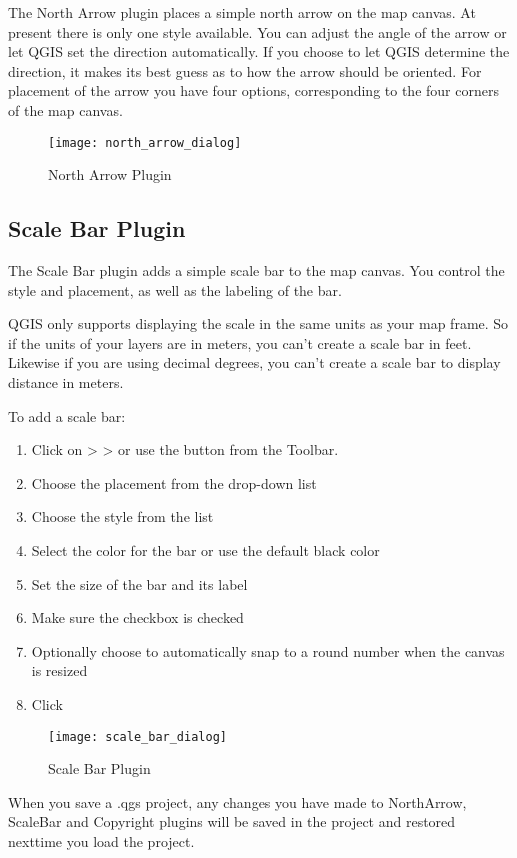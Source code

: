 The North Arrow plugin places a simple north arrow on the map canvas. At
present there is only one style available. You can adjust the angle of the
arrow or let QGIS set the direction automatically. If you choose to let
QGIS determine the direction, it makes its best guess as to how the arrow
should be oriented. For placement of the arrow you have four options, 
corresponding to the four corners of the map canvas.

\begin{figure}[ht]
   \centering
   \caption{North Arrow Plugin \nixcaption}\label{fig:north_arrow}\smallskip
   \texttt{[image: north\_arrow\_dialog]}
\end{figure}

\subsection{Scale Bar Plugin}
The Scale Bar plugin adds a simple scale bar to the map canvas. You
control the style and placement, as well as the labeling of the bar. 

QGIS only supports displaying the scale in the same units as your map frame. So
if the units of your layers are in meters, you can't create a scale bar in
feet. Likewise if you are using decimal degrees, you can't create a scale
bar to display distance in meters.

To add a scale bar:

\begin{enumerate}
\item Click on  >  >  or use the  button from the Toolbar.
\item Choose the placement from the  drop-down list
\item Choose the style from the  list
\item Select the color for the bar  or use the default black color
\item Set the size of the bar and its label 
\item Make sure the  checkbox is checked
\item Optionally choose to automatically snap to a round number when the
  canvas is resized 
\item Click  
\end{enumerate} 

\begin{figure}[ht]
   \centering
   \caption{Scale Bar Plugin \nixcaption}\label{fig:scale_bar}\smallskip
   \texttt{[image: scale\_bar\_dialog]}
\end{figure}

\begin{Tip}\caption{\textsc{Plugins Settings Saved to Project}}
When you save a .qgs project, any changes you have made to NorthArrow, ScaleBar and Copyright plugins will be saved in the project and restored nexttime you load the project.
\end{Tip}
